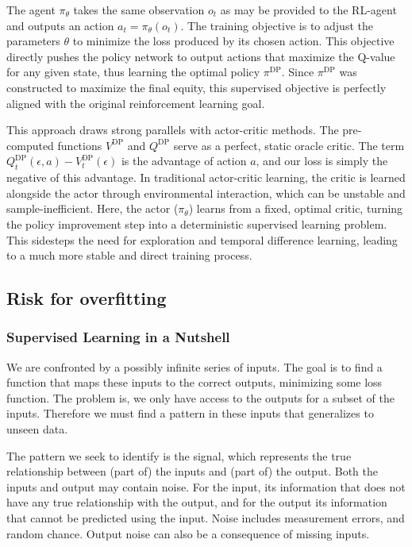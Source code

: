 The agent $\pi_\theta$ takes the same observation $o_t$ as may be provided to the RL-agent and outputs an action $a_t = \pi_\theta(o_t)$. The training objective is to adjust the parameters $\theta$ to minimize the loss produced by its chosen action. This objective directly pushes the policy network to output actions that maximize the Q-value for any given state, thus learning the optimal policy $\pi^\text{DP}$. Since $\pi^\text{DP}$ was constructed to maximize the final equity, this supervised objective is perfectly aligned with the original reinforcement learning goal.

This approach draws strong parallels with actor-critic methods. The pre-computed functions $V^\text{DP}$ and $Q^\text{DP}$ serve as a perfect, static oracle critic. The term $Q_t^\text{DP}(\epsilon, a) - V^\text{DP}_t(\epsilon)$ is the advantage of action $a$, and our loss is simply the negative of this advantage. In traditional actor-critic learning, the critic is learned alongside the actor through environmental interaction, which can be unstable and sample-inefficient. Here, the actor ($\pi_\theta$) learns from a fixed, optimal critic, turning the policy improvement step into a deterministic supervised learning problem. This sidesteps the need for exploration and temporal difference learning, leading to a much more stable and direct training process.

\subsection{Risk for overfitting}

\subsubsection{Supervised Learning in a Nutshell}

We are confronted by a possibly infinite series of inputs. The goal is to find a function that maps these inputs to the correct outputs, minimizing some loss function. The problem is, we only have access to the outputs for a subset of the inputs. Therefore we must find a pattern in these inputs that generalizes to unseen data.

The pattern we seek to identify is the signal, which represents the true relationship between (part of) the inputs and (part of) the output. Both the inputs and output may contain noise. For the input, its information that does not have any true relationship with the output, and for the output its information that cannot be predicted using the input. Noise includes measurement errors, and random chance. Output noise can also be a consequence of missing inputs.

